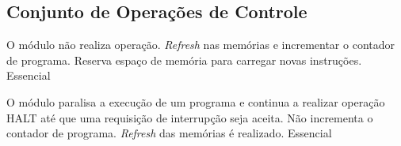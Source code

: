 \subsection{Conjunto de Operações de Controle}
	    
	\begin{functional}
		
		{O módulo não realiza operação. \textit{Refresh} nas memórias e incrementar o contador de programa. Reserva espaço de memória para carregar novas instruções.}
		{Essencial} 
       
		{O módulo paralisa a execução de um programa e continua a realizar operação HALT até que uma requisição de interrupção seja aceita. Não incrementa o contador de programa. \textit{Refresh} das memórias é realizado.}
		{Essencial}
 		
	  \end{functional}